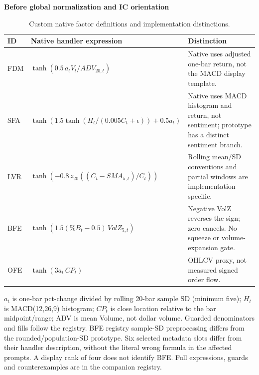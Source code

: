 \begin{table}[!htbp]
\centering\small
\setlength{\tabcolsep}{3pt}
\renewcommand{\arraystretch}{1.15}
\caption{Custom native factor definitions and implementation distinctions.}
\label{tab:custom_definitions}
\textbf{Before global normalization and IC orientation}\par\smallskip
\begin{tabular}{lp{8.0cm}p{5.0cm}}
\hline
ID & Native handler expression & Distinction \\
\hline
FDM & $\tanh(0.5\,a_t V_t/ADV_{20,t})$ & Native uses adjusted one-bar return, not the MACD display template. \\
SFA & $\tanh(1.5\tanh(H_t/(0.005C_t+\epsilon))+0.5a_t)$ & Native uses MACD histogram and return, not sentiment; prototype has a distinct sentiment branch. \\
LVR & $\tanh(-0.8\,z_{20}((C_t-SMA_{5,t})/C_t))$ & Rolling mean/SD conventions and partial windows are implementation-specific. \\
BFE & $\tanh(1.5(\%B_t-0.5)\,VolZ_{5,t})$ & Negative VolZ reverses the sign; zero cancels. No squeeze or volume-expansion gate. \\
OFE & $\tanh(3a_t\,CP_t)$ & OHLCV proxy, not measured signed order flow. \\
\hline
\end{tabular}\par\medskip
\begin{minipage}{\textwidth}\footnotesize $a_t$ is one-bar pct-change divided by rolling 20-bar sample SD (minimum five); $H_t$ is MACD(12,26,9) histogram; $CP_t$ is close location relative to the bar midpoint/range; ADV is mean Volume, not dollar volume. Guarded denominators and fills follow the registry. BFE registry sample-SD preprocessing differs from the rounded/population-SD prototype. Six selected metadata slots differ from their handler description, without the literal wrong formula in the affected prompts. A display rank of four does not identify BFE. Full expressions, guards and counterexamples are in the companion registry.\end{minipage}
\end{table}
